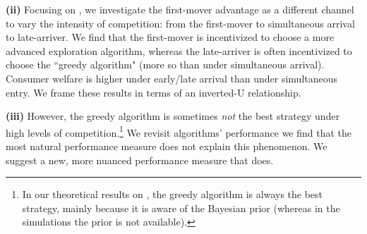 
\textbf{(ii)} Focusing on \HardMax, we investigate the first-mover advantage as a different channel to vary the intensity of competition: from the first-mover to simultaneous arrival to late-arriver. We find that the first-mover is incentivized to choose a more advanced exploration algorithm, whereas the late-arriver is often incentivized to choose the ``greedy algorithm" (more so than under simultaneous arrival). Consumer welfare is higher under early/late arrival than under simultaneous entry. We frame these results in terms of an inverted-U relationship.


\textbf{(iii)} 
However, the greedy algorithm is sometimes \emph{not} the best strategy under high levels of competition.\footnote{In our theoretical results on \HardMax, the greedy algorithm is always the best strategy, mainly because it is aware of the Bayesian prior (whereas in the simulations  the prior is not available).}
We revisit algorithms' performance  we find that the most natural performance measure does not explain this phenomenon. We suggest a new, more nuanced performance measure that does.


